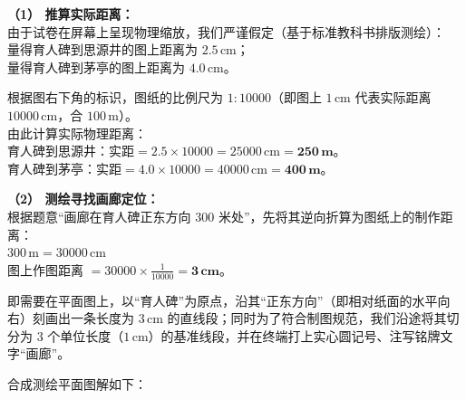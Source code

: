 \textbf{（1） 推算实际距离：} \\
由于试卷在屏幕上呈现物理缩放，我们严谨假定（基于标准教科书排版测绘）：\\
量得育人碑到思源井的图上距离为 \textbf{$2.5\,\text{cm}$}；\\
量得育人碑到茅亭的图上距离为 \textbf{$4.0\,\text{cm}$}。

根据图右下角的标识，图纸的比例尺为 $1:10000$（即图上 $1\,\text{cm}$ 代表实际距离 $10000\,\text{cm}$，合 $100\,\text{m}$）。\\
由此计算实际物理距离：\\
育人碑到思源井：$\text{实距} = 2.5 \times 10000 = 25000\,\text{cm} = \boldsymbol{250\,\text{m}}$。\\
育人碑到茅亭：$\text{实距} = 4.0 \times 10000 = 40000\,\text{cm} = \boldsymbol{400\,\text{m}}$。

\vspace{0.4cm}

\textbf{（2） 测绘寻找画廊定位：} \\
根据题意“画廊在育人碑正东方向 $300$ 米处”，先将其逆向折算为图纸上的制作距离：\\
$300\,\text{m} = 30000\,\text{cm}$ \\
图上作图距离 $= 30000 \times \frac{1}{10000} = \boldsymbol{3\,\text{cm}}$。

即需要在平面图上，以“育人碑”为原点，沿其“正东方向”（即相对纸面的水平向右）刻画出一条长度为 $3\,\text{cm}$ 的直线段；同时为了符合制图规范，我们沿途将其切分为 $3$ 个单位长度（$1\,\text{cm}$）的基准线段，并在终端打上实心圆记号、注写铭牌文字“画廊”。

\vspace{0.4cm}

合成测绘平面图解如下：

